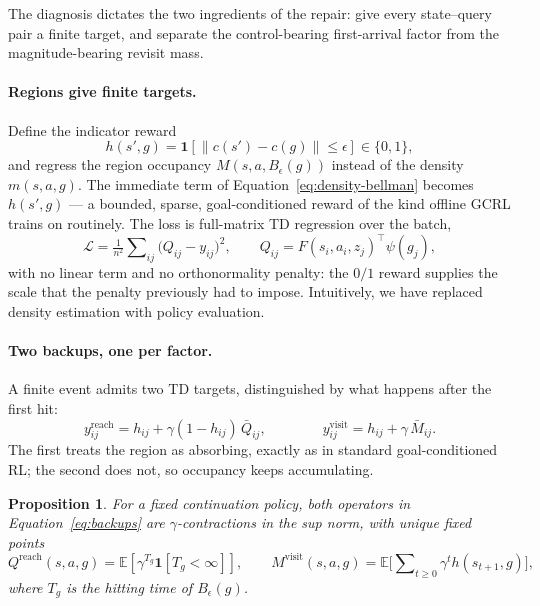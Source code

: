 \documentclass{article}
\newcommand{\E}{\mathbb{E}}
\newcommand{\ind}[1]{\mathbf{1}\!\left[#1\right]}
\newcommand{\cube}{c}
\newcommand{\Reach}{\mathrm{reach}}
\newcommand{\Visit}{\mathrm{visit}}
\newtheorem{proposition}{Proposition}
\begin{document}
The diagnosis dictates the two ingredients of the repair: give every
state--query pair a finite target, and separate the control-bearing
first-arrival factor from the magnitude-bearing revisit mass.

\paragraph{Regions give finite targets.}
Define the indicator reward
\begin{equation}
\label{eq:hit}
h(s',g)=\ind{\|\cube(s')-\cube(g)\|\le\epsilon}\in\{0,1\},
\end{equation}
and regress the region occupancy $M(s,a,B_\epsilon(g))$ instead of the density
$m(s,a,g)$. The immediate term of Equation~\ref{eq:density-bellman} becomes
$h(s',g)$ --- a bounded, sparse, goal-conditioned reward of the kind offline
GCRL trains on routinely. The loss is full-matrix TD regression over the batch,
\begin{equation}
\label{eq:matrix-loss}
\mathcal{L}=\tfrac{1}{n^2}\sum\nolimits_{ij}\big(Q_{ij}-y_{ij}\big)^2,
\qquad
Q_{ij}=F(s_i,a_i,z_j)^{\top}\psi(g_j),
\end{equation}
with no linear term and no orthonormality penalty: the $0/1$ reward supplies
the scale that the penalty previously had to impose. Intuitively, we have
replaced density estimation with policy evaluation.

\paragraph{Two backups, one per factor.}
A finite event admits two TD targets, distinguished by what happens after the
first hit:
\begin{equation}
\label{eq:backups}
y^{\Reach}_{ij}=h_{ij}+\gamma(1-h_{ij})\,\bar Q_{ij},
\qquad\qquad
y^{\Visit}_{ij}=h_{ij}+\gamma\,\bar M_{ij}.
\end{equation}
The first treats the region as absorbing, exactly as in standard
goal-conditioned RL; the second does not, so occupancy keeps accumulating.

\begin{proposition}
\label{prop:fixed-points}
For a fixed continuation policy, both operators in Equation~\ref{eq:backups}
are $\gamma$-contractions in the sup norm, with unique fixed points
\begin{equation*}
Q^{\Reach}(s,a,g)=\E\!\left[\gamma^{T_g}\ind{T_g<\infty}\right],
\qquad
M^{\Visit}(s,a,g)=\E\Big[\sum\nolimits_{t\ge0}\gamma^t h(s_{t+1},g)\Big],
\end{equation*}
where $T_g$ is the hitting time of $B_\epsilon(g)$.
\end{proposition}
\end{document}
